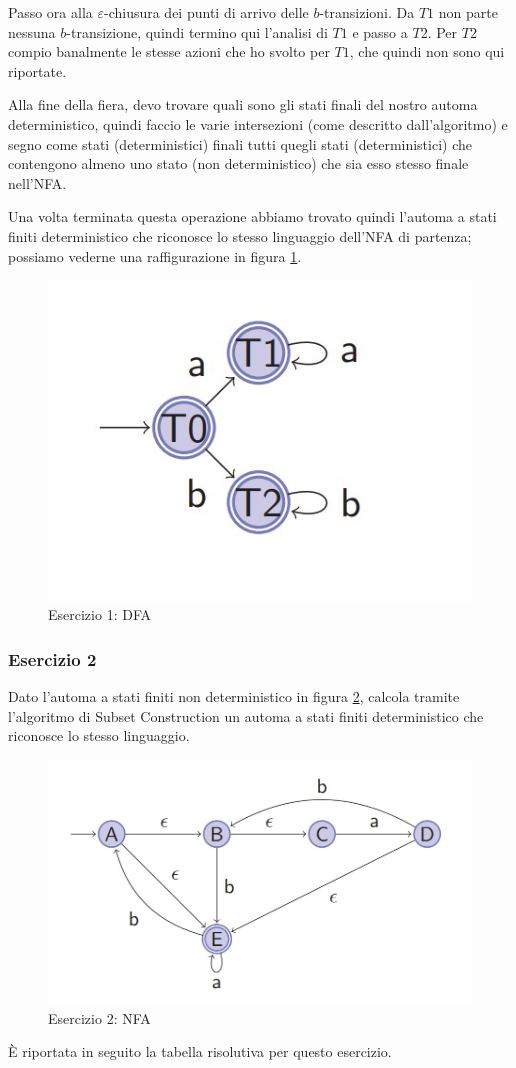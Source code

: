 \documentclass[class=book, crop=false, oneside, 12pt]{standalone}
\begin{document}
Passo ora alla \(\varepsilon\)-chiusura dei punti di arrivo delle \(b\)-transizioni. Da \(T1\) non parte nessuna \(b\)-transizione, quindi termino qui l'analisi di \(T1\) e passo a \(T2\).
Per \(T2\) compio banalmente le stesse azioni che ho svolto per \(T1\), che quindi non sono qui riportate.

Alla fine della fiera, devo trovare quali sono gli stati finali del nostro automa deterministico, quindi faccio le varie intersezioni (come descritto dall'algoritmo) e segno come stati (deterministici) finali tutti quegli stati (deterministici) che contengono almeno uno stato (non deterministico) che sia esso stesso finale nell'NFA.

Una volta terminata questa operazione abbiamo trovato quindi l’automa a stati finiti deterministico che riconosce lo stesso linguaggio dell’NFA di partenza; possiamo vederne una raffigurazione in figura \ref{sol_sc_1}.
\begin{figure}[H]
    \centering
    \includegraphics[width=.7\textwidth,keepaspectratio]{s1_subset_construction.jpg}
    \caption{Esercizio 1: DFA}
    \label{sol_sc_1}
\end{figure}


\subsubsection*{Esercizio 2}
Dato l'automa a stati finiti non deterministico in figura \ref{es_sc_2}, calcola tramite l'algoritmo di Subset Construction un automa a stati finiti deterministico che riconosce lo stesso linguaggio.
\begin{figure}[H]
    \centering
    \includegraphics[width=.8\textwidth,keepaspectratio]{e2_subset_construction.jpg}
    \caption{Esercizio 2: NFA}
    \label{es_sc_2}
\end{figure}
È riportata in seguito la tabella risolutiva per questo esercizio.\\
\end{document}
